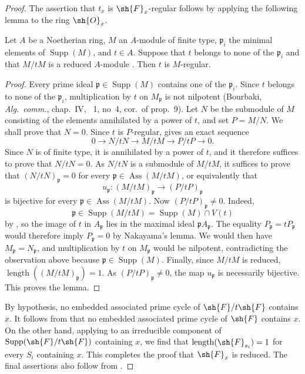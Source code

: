 \begin{proof}
The assertion that $t_x$ is $\sh{F}_x$-regular follows by applying the following lemma to the ring $\sh{O}_x$.

\begin{lemma}[3.4.6.1]
\label{IV.3.4.6.1}
Let $A$ be a Noetherian ring, $M$ an $A$-module of finite type, $\mathfrak p_i$ the minimal elements of $\operatorname{Supp}(M)$, and $t\in A$.
Suppose that $t$ belongs to none of the $\mathfrak p_i$ and that $M/tM$ is a reduced $A$-module .
Then $t$ is $M$-regular.
\end{lemma}

\begin{proof}
Every prime ideal $\mathfrak p\in\operatorname{Supp}(M)$ contains one of the $\mathfrak p_i$.
Since $t$ belongs to none of the $\mathfrak p_i$, multiplication by $t$ on $M_{\mathfrak p}$ is not nilpotent (Bourbaki, \emph{Alg.\ comm.}, chap.~IV, \textsection~1, no~4, cor.\ of prop.~9).
Let $N$ be the submodule of $M$ consisting of the elements annihilated by a power of $t$, and set $P=M/N$.
We shall prove that $N=0$.
Since $t$ is $P$-regular,  gives an exact sequence
\[
0\longrightarrow N/tN
 \longrightarrow M/tM
 \longrightarrow P/tP
 \longrightarrow 0.
\]
Since $N$ is of finite type, it is annihilated by a power of $t$, and it therefore suffices to prove that $N/tN=0$.
As $N/tN$ is a submodule of $M/tM$, it suffices to prove that $(N/tN)_{\mathfrak p}=0$ for every $\mathfrak p\in\operatorname{Ass}(M/tM)$, or equivalently that
\[
u_{\mathfrak p}:(M/tM)_{\mathfrak p}\longrightarrow(P/tP)_{\mathfrak p}
\]
is bijective for every $\mathfrak p\in\operatorname{Ass}(M/tM)$.
Now $(P/tP)_{\mathfrak p}\neq 0$.
Indeed,
\[
\mathfrak p\in\operatorname{Supp}(M/tM)
  =\operatorname{Supp}(M)\cap V(t)
\]
by , so the image of $t$ in $A_{\mathfrak p}$ lies in the maximal ideal $\mathfrak pA_{\mathfrak p}$.
The equality $P_{\mathfrak p}=tP_{\mathfrak p}$ would therefore imply $P_{\mathfrak p}=0$ by Nakayama's lemma.
We would then have $M_{\mathfrak p}=N_{\mathfrak p}$, and multiplication by $t$ on $M_{\mathfrak p}$ would be nilpotent, contradicting the observation above because $\mathfrak p\in\operatorname{Supp}(M)$.
Finally, since $M/tM$ is reduced, $\operatorname{length}((M/tM)_{\mathfrak p})=1$.
As $(P/tP)_{\mathfrak p}\neq 0$, the map $u_{\mathfrak p}$ is necessarily bijective.
This proves the lemma.
\end{proof}

By hypothesis, no embedded associated prime cycle of $\sh{F}/t\sh{F}$ contains $x$.
It follows from  that no embedded associated prime cycle of $\sh{F}$ contains $x$.
On the other hand, applying  to an irreducible component of $\operatorname{Supp}(\sh{F}/t\sh{F})$ containing $x$, we find that $\operatorname{length}(\sh{F}_{s_i})=1$ for every $S_i$ containing $x$.
This completes the proof that $\sh{F}_x$ is reduced.
The final assertions also follow from .
\end{proof}

